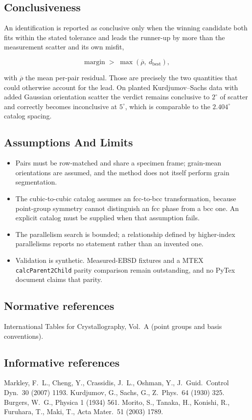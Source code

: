 \subsection{Conclusiveness}

An identification is reported as conclusive only when the winning candidate both fits within the
stated tolerance and leads the runner-up by more than the measurement scatter and its own misfit,

\begin{equation}
\text{margin} \;>\; \max\!\left( \overline{\rho},\ d_{\mathrm{best}} \right),
\end{equation}

with $\overline{\rho}$ the mean per-pair residual. Those are precisely the two quantities that
could otherwise account for the lead. On planted Kurdjumov--Sachs data with added Gaussian
orientation scatter the verdict remains conclusive to $2^{\circ}$ of scatter and correctly
becomes inconclusive at $5^{\circ}$, which is comparable to the $2.404^{\circ}$ catalog spacing.

\subsection{Assumptions And Limits}

\begin{itemize}
  \item Pairs must be row-matched and share a specimen frame; grain-mean orientations are
        assumed, and the method does not itself perform grain segmentation.
  \item The cubic-to-cubic catalog assumes an fcc-to-bcc transformation, because point-group
        symmetry cannot distinguish an fcc phase from a bcc one. An explicit catalog must be
        supplied when that assumption fails.
  \item The parallelism search is bounded; a relationship defined by higher-index parallelisms
        reports no statement rather than an invented one.
  \item Validation is synthetic. Measured-EBSD fixtures and a MTEX \texttt{calcParent2Child}
        parity comparison remain outstanding, and no PyTex document claims that parity.
\end{itemize}

\subsection*{Normative references}

International Tables for Crystallography, Vol.~A (point groups and basis conventions).

\subsection*{Informative references}

Markley, F.~L., Cheng, Y., Crassidis, J.~L., Oshman, Y., J.~Guid.~Control Dyn.~30 (2007) 1193.
Kurdjumov, G., Sachs, G., Z.~Phys.~64 (1930) 325.
Burgers, W.~G., Physica 1 (1934) 561.
Morito, S., Tanaka, H., Konishi, R., Furuhara, T., Maki, T., Acta Mater.~51 (2003) 1789.
